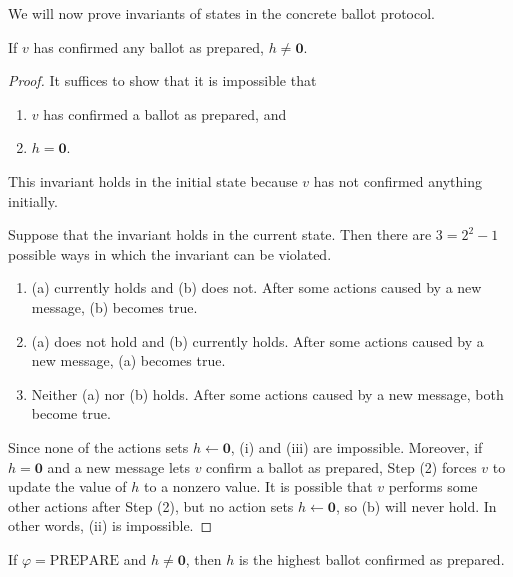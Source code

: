 We will now prove invariants of states in the concrete ballot protocol.

\begin{lem}\label{nonzero_h_if_confirmed}
    If $v$ has confirmed any ballot as prepared, $h \ne \textbf{0}$.
\end{lem}

\begin{proof}
    It suffices to show that it is impossible that
    \begin{enumerate}[label=(\alph*)]
        \item %
            $v$ has confirmed a ballot as prepared, and
        \item %
            $h = \textbf{0}$.
    \end{enumerate}

    This invariant holds in the initial state because $v$ has not confirmed anything initially.

    Suppose that the invariant holds in the current state.
    Then there are $3 = 2^2 - 1$ possible ways in which the invariant can be violated.
    \begin{enumerate}[label=(\roman*)]
        \item %
            (a) currently holds and (b) does not.
            After some actions caused by a new message, (b) becomes true.
        \item %
            (a) does not hold and (b) currently holds.
            After some actions caused by a new message, (a) becomes true.
        \item %
            Neither (a) nor (b) holds.
            After some actions caused by a new message, both become true.
    \end{enumerate}
    Since none of the actions sets $h \leftarrow \textbf{0}$, (i) and (iii) are impossible.
    Moreover, if $h = \textbf{0}$ and a new message lets $v$ confirm a ballot as prepared, Step (2) forces $v$ to update the value of $h$ to a nonzero value.
    It is possible that $v$ performs some other actions after Step (2), but no action sets $h \leftarrow \textbf{0}$, so (b) will never hold.
    In other words, (ii) is impossible.
\end{proof}

\begin{lem}\label{lem_h_highest_ballot}
    If $\varphi = \text{PREPARE}$ and $h \ne \textbf{0}$, then $h$ is the highest ballot confirmed as prepared.
\end{lem}

